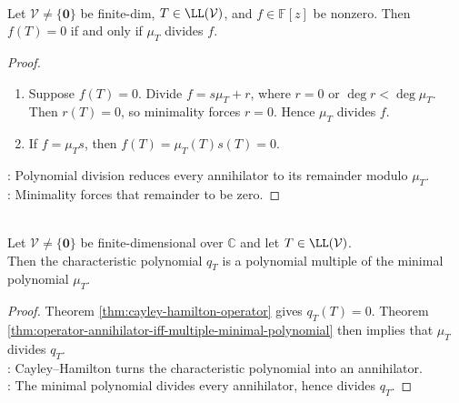\begin{theorem} \label{thm:operator-annihilator-iff-multiple-minimal-polynomial} \\
Let $\mathcal{V}\neq\{\mathbf{0}\}$ be finite-dim, $T\in\LL(\mathcal{V})$, and $f\in\mathbb{F}[z]$ be nonzero. Then $f(T)=0$ if and only if $\mu_T$ divides $f$.
\begin{proof}
\begin{enumerate}[label=\roman*.]
\setlength{\itemsep}{0pt}
\item[$(\Rightarrow)$] Suppose $f(T)=0$. Divide $f=s\mu_T+r$, where $r=0$ or $\deg r<\deg\mu_T$.\\
Then $r(T)=0$, so minimality forces $r=0$. Hence $\mu_T$ divides $f$.
\item[$(\Leftarrow)$] If $f=\mu_Ts$, then $f(T)=\mu_T(T)s(T)=0$.
\end{enumerate}
: Polynomial division reduces every annihilator to its remainder modulo $\mu_T$.\\
: Minimality forces that remainder to be zero.
\end{proof}
\end{theorem}

\begin{corollary} \label{cor:operator-characteristic-multiple-minimal-polynomial} \\
Let $\mathcal{V}\neq\{\mathbf{0}\}$ be finite-dimensional over $\mathbb{C}$ and let $T\in\LL(\mathcal{V})$.\\
Then the characteristic polynomial $q_T$ is a polynomial multiple of the minimal polynomial $\mu_T$.
\begin{proof}
Theorem \ref{thm:cayley-hamilton-operator} gives $q_T(T)=0$. Theorem \ref{thm:operator-annihilator-iff-multiple-minimal-polynomial} then implies that $\mu_T$ divides $q_T$.\\
: Cayley--Hamilton turns the characteristic polynomial into an annihilator.\\
: The minimal polynomial divides every annihilator, hence divides $q_T$.
\end{proof}
\end{corollary}

